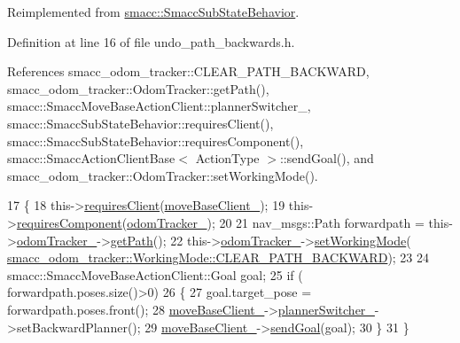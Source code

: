 Reimplemented from \hyperlink{classsmacc_1_1SmaccSubStateBehavior_a7c28e1c46238bbb2c2e0450573c6de94}{smacc\+::\+Smacc\+Sub\+State\+Behavior}.



Definition at line 16 of file undo\+\_\+path\+\_\+backwards.\+h.



References smacc\+\_\+odom\+\_\+tracker\+::\+C\+L\+E\+A\+R\+\_\+\+P\+A\+T\+H\+\_\+\+B\+A\+C\+K\+W\+A\+RD, smacc\+\_\+odom\+\_\+tracker\+::\+Odom\+Tracker\+::get\+Path(), smacc\+::\+Smacc\+Move\+Base\+Action\+Client\+::planner\+Switcher\+\_\+, smacc\+::\+Smacc\+Sub\+State\+Behavior\+::requires\+Client(), smacc\+::\+Smacc\+Sub\+State\+Behavior\+::requires\+Component(), smacc\+::\+Smacc\+Action\+Client\+Base$<$ Action\+Type $>$\+::send\+Goal(), and smacc\+\_\+odom\+\_\+tracker\+::\+Odom\+Tracker\+::set\+Working\+Mode().


\begin{DoxyCode}
17   \{
18     this->\hyperlink{classsmacc_1_1SmaccSubStateBehavior_ae8361a9e794b02f9f3d962b881e4fd7d}{requiresClient}(\hyperlink{classUndoPathBackwards_ac9b783f5d06850fe1c3f03bb1308ca2f}{moveBaseClient\_});
19     this->\hyperlink{classsmacc_1_1SmaccSubStateBehavior_a9f31f62f886cc06017e92fa0d834b12d}{requiresComponent}(\hyperlink{classUndoPathBackwards_a7700dd293e08d1383f9e9247329480bc}{odomTracker\_});
20 
21     nav\_msgs::Path forwardpath = this->\hyperlink{classUndoPathBackwards_a7700dd293e08d1383f9e9247329480bc}{odomTracker\_}->\hyperlink{classsmacc__odom__tracker_1_1OdomTracker_ace0762f93bc272a426d3038f74dc8752}{getPath}();
22     this->\hyperlink{classUndoPathBackwards_a7700dd293e08d1383f9e9247329480bc}{odomTracker\_}->\hyperlink{classsmacc__odom__tracker_1_1OdomTracker_a38fbca999297c46dc95628cc60851a45}{setWorkingMode}(
      \hyperlink{namespacesmacc__odom__tracker_ade9730dd5cc10ccfad9362176cf46c33a0cf8f27617189e35619df3c18bda6274}{smacc\_odom\_tracker::WorkingMode::CLEAR\_PATH\_BACKWARD});
23     
24     smacc::SmaccMoveBaseActionClient::Goal goal;
25     \textcolor{keywordflow}{if} ( forwardpath.poses.size()>0)
26     \{
27       goal.target\_pose = forwardpath.poses.front();
28       \hyperlink{classUndoPathBackwards_ac9b783f5d06850fe1c3f03bb1308ca2f}{moveBaseClient\_}->\hyperlink{classsmacc_1_1SmaccMoveBaseActionClient_ae24164268108abf0b35cf51bfba5ec67}{plannerSwitcher\_}->setBackwardPlanner();
29       \hyperlink{classUndoPathBackwards_ac9b783f5d06850fe1c3f03bb1308ca2f}{moveBaseClient\_}->\hyperlink{classsmacc_1_1SmaccActionClientBase_a58c67a87c5fb8ea1633573c58fe3eee1}{sendGoal}(goal);
30     \}
31   \}    
\end{DoxyCode}


